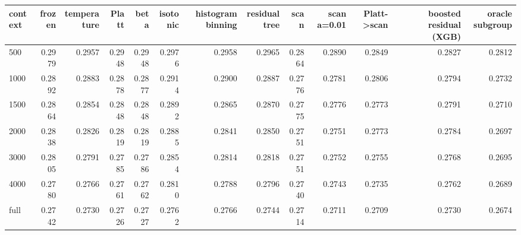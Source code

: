 \begin{tabular}{lrrrrrrrrrrrr}
\toprule
context & frozen & temperature & Platt & beta & isotonic & histogram binning & residual tree & scan & scan a=0.01 & Platt->scan & boosted residual (XGB) & oracle subgroup \\
\midrule
500 & 0.2979 & 0.2957 & 0.2948 & 0.2948 & 0.2976 & 0.2958 & 0.2965 & 0.2864 & 0.2890 & 0.2849 & 0.2827 & 0.2812 \\
1000 & 0.2892 & 0.2883 & 0.2878 & 0.2877 & 0.2914 & 0.2900 & 0.2887 & 0.2776 & 0.2781 & 0.2806 & 0.2794 & 0.2732 \\
1500 & 0.2864 & 0.2854 & 0.2848 & 0.2848 & 0.2892 & 0.2865 & 0.2870 & 0.2775 & 0.2776 & 0.2773 & 0.2791 & 0.2710 \\
2000 & 0.2838 & 0.2826 & 0.2819 & 0.2819 & 0.2885 & 0.2841 & 0.2850 & 0.2751 & 0.2751 & 0.2773 & 0.2784 & 0.2697 \\
3000 & 0.2805 & 0.2791 & 0.2785 & 0.2786 & 0.2854 & 0.2814 & 0.2818 & 0.2751 & 0.2752 & 0.2755 & 0.2768 & 0.2695 \\
4000 & 0.2780 & 0.2766 & 0.2761 & 0.2762 & 0.2810 & 0.2788 & 0.2796 & 0.2740 & 0.2743 & 0.2735 & 0.2762 & 0.2689 \\
full & 0.2742 & 0.2730 & 0.2726 & 0.2727 & 0.2762 & 0.2766 & 0.2744 & 0.2714 & 0.2711 & 0.2709 & 0.2730 & 0.2674 \\
\bottomrule
\end{tabular}
